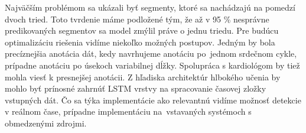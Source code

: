 \newpage

Najväčším problémom sa ukázali byť segmenty, ktoré sa nachádzajú na pomedzí dvoch tried. Toto tvrdenie máme podložené tým, že až v 95 \% nesprávne predikovaných segmentov sa model zmýlil práve o jednu triedu. Pre budúcu optimalizáciu riešenia vidíme niekoľko možných postupov. Jedným by bola precíznejšia anotácia dát, kedy navrhujeme anotáciu po~jednom srdečnom cykle, prípadne anotáciu po úsekoch variabilnej dĺžky. Spolupráca s kardiológom by tiež mohla viesť k presnejšej anotácii. Z hľadiska architektúr hlbokého učenia by mohlo byť prínosné zahrnúť LSTM vrstvy na spracovanie časovej zložky vstupných dát. Čo sa týka implementácie ako relevantnú vidíme možnosť detekcie v reálnom čase, prípadne implementáciu na~vstavaných systémoch s obmedzenými zdrojmi.
